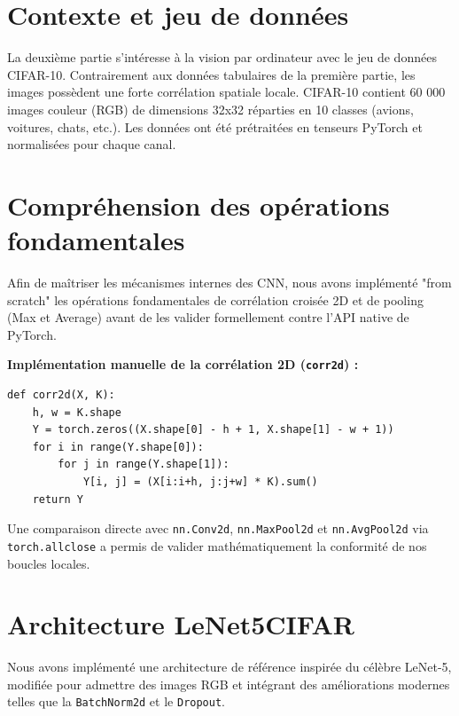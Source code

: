 
\section{Contexte et jeu de données}

La deuxième partie s'intéresse à la vision par ordinateur avec le jeu de données CIFAR-10. Contrairement aux données tabulaires de la première partie, les images possèdent une forte corrélation spatiale locale. CIFAR-10 contient 60 000 images couleur (RGB) de dimensions 32x32 réparties en 10 classes (avions, voitures, chats, etc.). Les données ont été prétraitées en tenseurs PyTorch et normalisées pour chaque canal.

\section{Compréhension des opérations fondamentales}

Afin de maîtriser les mécanismes internes des CNN, nous avons implémenté "from scratch" les opérations fondamentales de corrélation croisée 2D et de pooling (Max et Average) avant de les valider formellement contre l'API native de PyTorch.

\textbf{Implémentation manuelle de la corrélation 2D (\texttt{corr2d}) :}
\begin{verbatim}
def corr2d(X, K):
    h, w = K.shape
    Y = torch.zeros((X.shape[0] - h + 1, X.shape[1] - w + 1))
    for i in range(Y.shape[0]):
        for j in range(Y.shape[1]):
            Y[i, j] = (X[i:i+h, j:j+w] * K).sum()
    return Y
\end{verbatim}

Une comparaison directe avec \texttt{nn.Conv2d}, \texttt{nn.MaxPool2d} et \texttt{nn.AvgPool2d} via \texttt{torch.allclose} a permis de valider mathématiquement la conformité de nos boucles locales.

\section{Architecture LeNet5CIFAR}

Nous avons implémenté une architecture de référence inspirée du célèbre LeNet-5, modifiée pour admettre des images RGB et intégrant des améliorations modernes telles que la \texttt{BatchNorm2d} et le \texttt{Dropout}.

